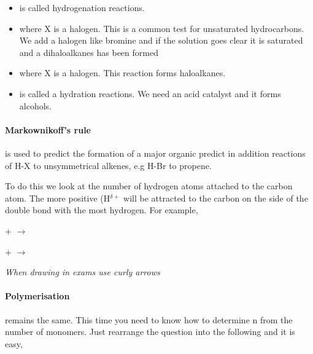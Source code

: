 	\begin{itemize}
		\item {} is called hydrogenation reactions.
		\item {} where X is a halogen. This is a common test for unsaturated hydrocarbons. We add a halogen like bromine and if the solution goes clear it is saturated and a dihaloalkanes has been formed
		\item {} where X is a halogen. This reaction forms haloalkanes.
		\item {} is called a hydration reactions.
		We need an acid catalyst and it forms alcohols.
	\end{itemize}
	
	
	\paragraph{Markownikoff's rule} is used to predict the formation of a major organic predict in addition reactions of H-X to unsymmetrical alkenes, e.g H-Br to propene.
	
	To do this we look at the number of hydrogen atoms attached to the carbon atom.
	The more positive (H$^{\delta +}$ will be attracted to the carbon on the side of the double bond with the most hydrogen.
	For example,
	
	\begin{center}
		 +  $\longrightarrow$
		
		\vspace{7mm}
		
		 +  $\longrightarrow$
		
		\vspace{7mm}
		
		
		\vspace{7mm}
		
		\textit{When drawing in exams use curly arrows} %
	\end{center}
	
	\paragraph{Polymerisation} remains the same.
	This time you need to know how to determine n from the number of monomers.
	Just rearrange the question into the following and it is easy,
	

